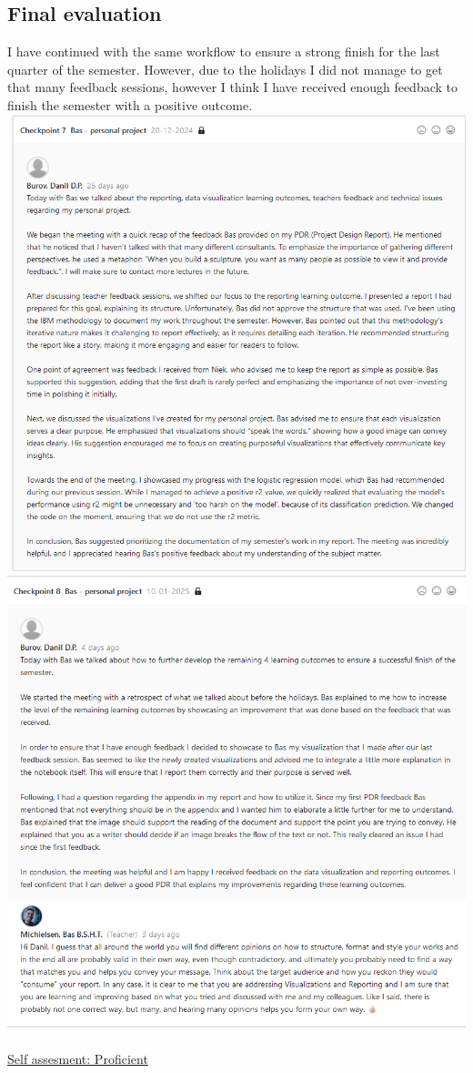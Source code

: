\documentclass{article}
\begin{document}
\subsection{Final evaluation}
I have continued with the same workflow to ensure a strong finish for the last quarter of the semester. However, due to the holidays I did not manage to get that many feedback sessions, however I think I have received enough feedback to finish the semester with a positive outcome.\\
\includegraphics[width=\textwidth,keepaspectratio]{images/Feedback_Bas_3.png}\\
\includegraphics[width=\textwidth,keepaspectratio]{images/Feedback_Bas_4.png}\\\\
\underline{Self assesment: Proficient}
\end{document}
